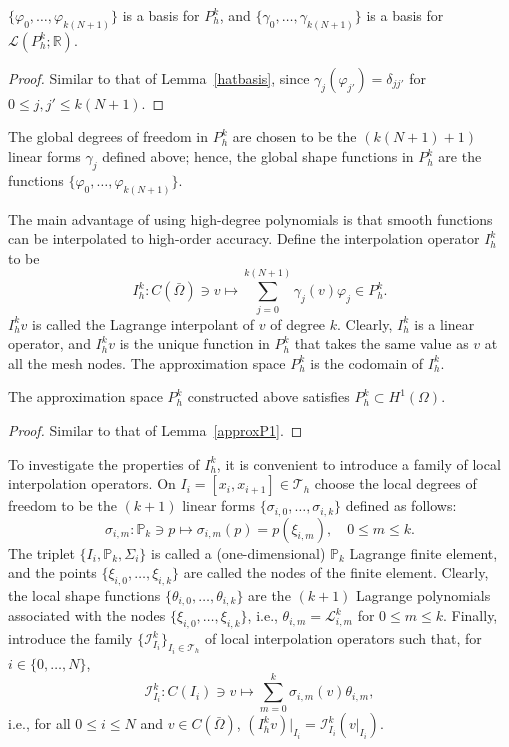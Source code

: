 \begin{lemma}
    $\{\varphi_0, \dots, \varphi_{k(N+1)}\}$ is a basis for $P_h^k$, and $\{\gamma_0, \dots, \gamma_{k(N+1)}\}$ is a basis for $\mathcal{L}(P_h^k; \mathbb{R})$.

\begin{proof}
    Similar to that of Lemma~\ref{hatbasis}, since $\gamma_j(\varphi_{j'}) = \delta_{jj'}$ for $0 \le j,j' \le k(N+1)$.
\end{proof}
\end{lemma}
The global degrees of freedom in $P_h^k$ are chosen to be the $(k(N+1)+1)$ linear forms $\gamma_j$ defined above; hence, the global shape functions in $P_h^k$ are the functions $\{\varphi_0, \dots, \varphi_{k(N+1)}\}$.

The main advantage of using high-degree polynomials is that smooth functions can be interpolated to high-order accuracy. Define the interpolation operator $I_h^k$ to be
\begin{equation*}
I_h^k: C(\bar{\Omega}) \ni v \mapsto \sum_{j=0}^{k(N+1)} \gamma_j(v) \varphi_j \in P_h^k.
\end{equation*}
$I_h^k v$ is called the Lagrange interpolant of $v$ of degree $k$. Clearly, $I_h^k$ is a linear operator, and $I_h^k v$ is the unique function in $P_h^k$ that takes the same value as $v$ at all the mesh nodes. The approximation space $P_h^k$ is the codomain of $I_h^k$. 

\begin{lemma}
    The approximation space $P_h^k$ constructed above satisfies $P_h^k \subset H^1(\Omega)$.
\begin{proof}
    Similar to that of Lemma~\ref{approxP1}.
\end{proof}
\end{lemma}
To investigate the properties of $I_h^k$, it is convenient to introduce a family of local interpolation operators. On $I_i = [x_i, x_{i+1}] \in \mathcal{T}_h$ choose the local degrees of freedom to be the $(k+1)$ linear forms $\{\sigma_{i,0}, \dots, \sigma_{i,k}\}$ defined as follows:
\begin{equation*}
\sigma_{i,m}: \mathbb{P}_k \ni p \mapsto \sigma_{i,m}(p) = p(\xi_{i,m}), \quad 0 \le m \le k.
\end{equation*}
The triplet $\{I_i, \mathbb{P}_k, \Sigma_i\}$ is called a (one-dimensional) $\mathbb{P}_k$ Lagrange finite element, and the points $\{\xi_{i,0}, \dots, \xi_{i,k}\}$ are called the nodes of the finite element. Clearly, the local shape functions $\{\theta_{i,0}, \dots, \theta_{i,k}\}$ are the $(k+1)$ Lagrange polynomials associated with the nodes $\{\xi_{i,0}, \dots, \xi_{i,k}\}$, i.e., $\theta_{i,m} = \mathcal{L}_{i,m}^k$ for $0 \le m \le k$. Finally, introduce the family $\{\mathcal{I}_{I_i}^k\}_{I_i \in \mathcal{T}_h}$ of local interpolation operators such that, for $i \in \{0, \dots, N\}$,
\begin{equation*}
\mathcal{I}_{I_i}^k: C(I_i) \ni v \mapsto \sum_{m=0}^k \sigma_{i,m}(v) \theta_{i,m},
\end{equation*}
i.e., for all $0 \le i \le N$ and $v \in C(\bar{\Omega})$, $(I_h^k v)|_{I_i} = \mathcal{I}_{I_i}^k(v|_{I_i})$.

